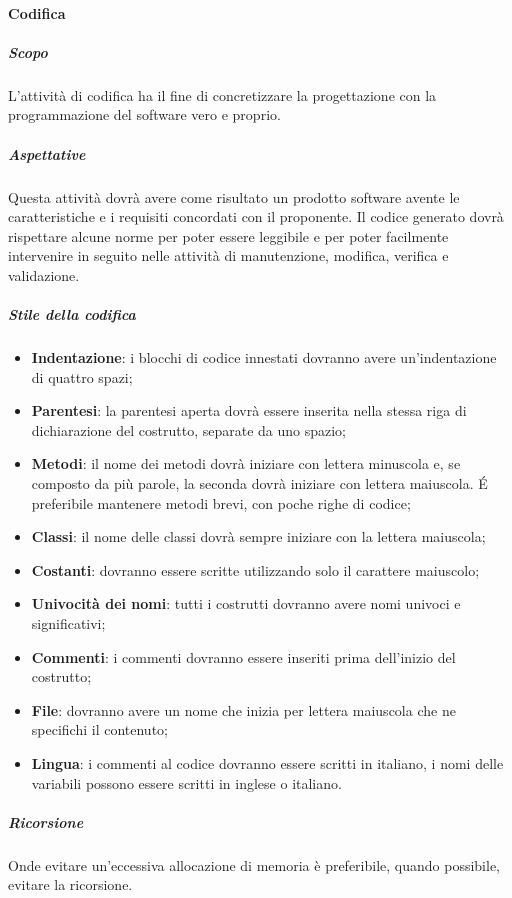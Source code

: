\paragraph{Codifica}
\subparagraph{Scopo}
L'attività di codifica ha il fine di concretizzare la progettazione con la programmazione del software vero e proprio.
\subparagraph{Aspettative}
Questa attività dovrà avere come risultato un prodotto software avente le caratteristiche e i requisiti concordati con il proponente. Il codice generato dovrà rispettare alcune norme per poter essere leggibile e per poter facilmente intervenire in seguito nelle attività di manutenzione, modifica, verifica e validazione.
\subparagraph{Stile della codifica}
\begin{itemize}
\item \textbf{Indentazione}: i blocchi di codice innestati dovranno avere un'indentazione di quattro spazi;
\item \textbf{Parentesi}: la parentesi aperta dovrà essere inserita nella stessa riga di dichiarazione del costrutto, separate da uno spazio; 
\item \textbf{Metodi}: il nome dei metodi dovrà iniziare con lettera minuscola e, se composto da più parole, la seconda dovrà iniziare con lettera maiuscola. \'E preferibile mantenere metodi brevi, con poche righe di codice;
\item \textbf{Classi}: il nome delle classi dovrà sempre iniziare con la lettera maiuscola;
\item \textbf{Costanti}: dovranno essere scritte utilizzando solo il carattere maiuscolo;
\item \textbf{Univocità dei nomi}: tutti i costrutti dovranno avere nomi univoci e significativi;
\item \textbf{Commenti}: i commenti dovranno essere inseriti prima dell'inizio del costrutto;
\item \textbf{File}: dovranno avere un nome che inizia per lettera maiuscola che ne specifichi il contenuto;
\item \textbf{Lingua}: i commenti al codice dovranno essere scritti in italiano, i nomi delle variabili possono essere scritti in inglese o italiano.
\end{itemize}
\subparagraph{Ricorsione}
Onde evitare un'eccessiva allocazione di memoria è preferibile, quando possibile, evitare la ricorsione.
